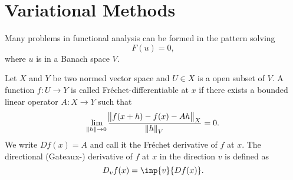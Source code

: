 \chapter{Variational Methods}
Many problems in functional analysis can be formed in the pattern solving 
\begin{equation}
    F(u) = 0, 
\end{equation}
where $u$ is in a Banach space $V$.

\begin{defn}
Let $X$ and $Y$ be two normed vector space and $U \in X$ is a open subset 
of $V$. A function $f: U \to Y$ is called Fréchet-differentiable at $x$ if 
there exists a bounded linear operator $A: X \to Y$ such that 
\begin{equation}
    \lim _{\norm{h} \to 0} \frac{\norm{f(x+h) - f(x) - Ah}_X}
    {\norm{h}_V} = 0.
\end{equation}
We write $D f(x) = A$ and call it the Fréchet derivative of $f$ at $x$.
The directional (Gateaux-) derivative of $f$ at $x$ in the direction $v$ 
is defined as 
\begin{equation}
    D_vf(x) = \inp{v}{Df(x)}.
\end{equation}
\end{defn}

